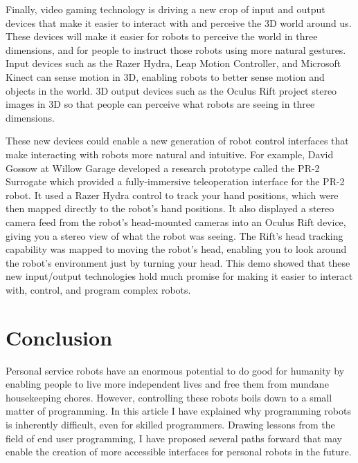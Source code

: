 \documentclass[10pt,twocolumn]{article}
\begin{document}
Finally, video gaming technology is driving a new crop of input and output devices that make it easier to interact with and perceive the 3D world around us. These devices will make it easier for robots to perceive the world in three dimensions, and for people to instruct those robots using more natural gestures. Input devices such as the Razer Hydra, Leap Motion Controller, and Microsoft Kinect can sense motion in 3D, enabling robots to better sense motion and objects in the world. 3D output devices such as the Oculus Rift project stereo images in 3D so that people can perceive what robots are seeing in three dimensions.

These new devices could enable a new generation of robot control interfaces that make interacting with robots more natural and intuitive. For example, David Gossow at Willow Garage developed a research prototype called the PR-2 Surrogate which provided a fully-immersive teleoperation interface for the PR-2 robot. It used a Razer Hydra control to track your hand positions, which were then mapped directly to the robot's hand positions. It also displayed a stereo camera feed from the robot's head-mounted cameras into an Oculus Rift device, giving you a stereo view of what the robot was seeing. The Rift's head tracking capability was mapped to moving the robot's head, enabling you to look around the robot's environment just by turning your head. This demo showed that these new input/output technologies hold much promise for making it easier to interact with, control, and program complex robots.

\section{Conclusion}

Personal service robots have an enormous potential to do good for humanity by enabling people to live more independent lives and free them from mundane housekeeping chores. However, controlling these robots boils down to a small matter of programming. In this article I have explained why programming robots is inherently difficult, even for skilled programmers.  Drawing lessons from the field of end user programming, I have proposed several paths forward that may enable the creation of more accessible interfaces for personal robots in the future.

\end{document}
